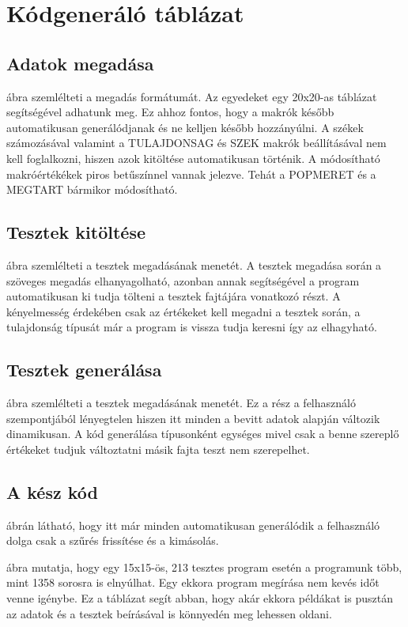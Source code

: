 \documentclass[12pt,a4paper,oneside]{report}
\begin{document}
\appendix

\chapter{Kódgeneráló táblázat}
\section*{Adatok megadása}
 ábra szemlélteti a megadás formátumát. Az egyedeket egy 20x20-as táblázat segítségével adhatunk meg.
Ez ahhoz fontos, hogy a makrók később automatikusan generálódjanak és ne kelljen később hozzányúlni.
A székek számozásával valamint a TULAJDONSAG és SZEK makrók beállításával nem kell foglalkozni, hiszen azok kitöltése automatikusan történik.
A módosítható makróértékékek piros betűszínnel vannak jelezve.
Tehát a POPMERET és a MEGTART bármikor módosítható.


\section*{Tesztek kitöltése}

 ábra szemlélteti a tesztek megadásának menetét.
A tesztek megadása során a szöveges megadás elhanyagolható, azonban annak segítségével a program automatikusan ki tudja tölteni a tesztek fajtájára vonatkozó részt.
A kényelmesség érdekében csak az értékeket kell megadni a tesztek során, a tulajdonság típusát már a program is vissza tudja keresni így az elhagyható.


\section*{Tesztek generálása}

 ábra szemlélteti a tesztek megadásának menetét.
Ez a rész a felhasználó szempontjából lényegtelen hiszen itt minden a bevitt adatok alapján változik dinamikusan.
A kód generálása típusonként egységes mivel csak a benne szereplő értékeket tudjuk változtatni másik fajta teszt nem szerepelhet.


\section*{A kész kód}

 ábrán látható, hogy itt már minden automatikusan generálódik a felhasználó dolga csak a szűrés frissítése és a kimásolás.

 ábra mutatja, hogy egy 15x15-ös, 213 tesztes program esetén a programunk több, mint 1358 sorosra is elnyúlhat.
Egy ekkora program megírása nem kevés időt venne igénybe.
Ez a táblázat segít abban, hogy akár ekkora példákat is pusztán az adatok és a tesztek beírásával is könnyedén meg lehessen oldani.

\end{document}
